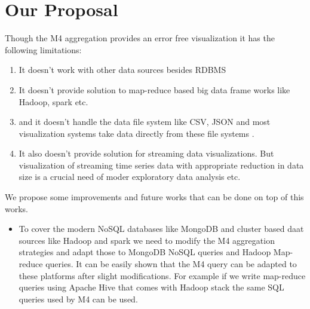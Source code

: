\section{Our Proposal}
Though the M4 aggregation provides an error free visualization it has the following limitations:
\begin{enumerate}
	\item It doesn't work with other data sources besides RDBMS
	\item It doesn't provide solution to map-reduce based big data frame works like Hadoop, spark etc.
	\item and it doesn't handle the data file system like CSV, JSON and most visualization systems take data directly from these file systems \cite{bostock2011d3}.
	\item It also doesn't provide solution for streaming data visualizations. But visualization of streaming time series data with appropriate reduction in data size is a crucial need of moder exploratory data analysis etc.
\end{enumerate}
We propose some improvements and future works that can be done on top of this works.
\begin{itemize}
	\item To cover the modern NoSQL databases like MongoDB and cluster based daat sources like Hadoop and spark we need to modify the M4 aggregation strategies and adapt those to MongoDB NoSQL queries and Hadoop Map-reduce queries. It can be easily shown that the M4 query can be adapted to these platforms after slight modifications. For example if we write map-reduce queries using Apache Hive \cite{thusoo2009hive,barbierato2013modeling} that comes with Hadoop stack the same SQL queries used by M4 can be used.
\end{itemize}